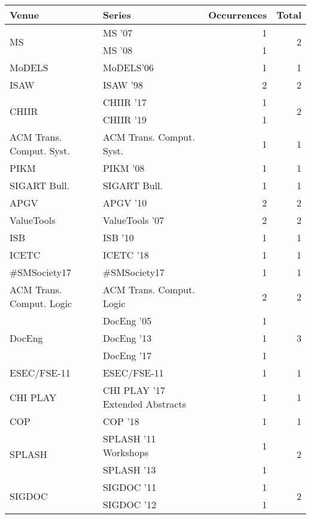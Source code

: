 \begin{table*}[t]
\begin{tabular}{llrr}
Venue & Series & Occurrences & Total\\\hline
\multirow{2}{*}{MS } & MS '07 & 1 & \multirow{2}{*}{2}\\
& MS '08 & 1 &\\
\multirow{1}{*}{MoDELS} & MoDELS'06 & 1 & \multirow{1}{*}{1}\\
\multirow{1}{*}{ISAW } & ISAW '98 & 2 & \multirow{1}{*}{2}\\
\multirow{2}{*}{CHIIR } & CHIIR '17 & 1 & \multirow{2}{*}{2}\\
& CHIIR '19 & 1 &\\
\multirow{1}{*}{ACM Trans. Comput. Syst.} & ACM Trans. Comput. Syst. & 1 & \multirow{1}{*}{1}\\
\multirow{1}{*}{PIKM } & PIKM '08 & 1 & \multirow{1}{*}{1}\\
\multirow{1}{*}{SIGART Bull.} & SIGART Bull. & 1 & \multirow{1}{*}{1}\\
\multirow{1}{*}{APGV } & APGV '10 & 2 & \multirow{1}{*}{2}\\
\multirow{1}{*}{ValueTools } & ValueTools '07 & 2 & \multirow{1}{*}{2}\\
\multirow{1}{*}{ISB } & ISB '10 & 1 & \multirow{1}{*}{1}\\
\multirow{1}{*}{ICETC } & ICETC '18 & 1 & \multirow{1}{*}{1}\\
\multirow{1}{*}{\#SMSociety17} & \#SMSociety17 & 1 & \multirow{1}{*}{1}\\
\multirow{1}{*}{ACM Trans. Comput. Logic} & ACM Trans. Comput. Logic & 2 & \multirow{1}{*}{2}\\
\multirow{3}{*}{DocEng } & DocEng '05 & 1 & \multirow{3}{*}{3}\\
& DocEng '13 & 1 &\\
& DocEng '17 & 1 &\\
\multirow{1}{*}{ESEC/FSE-11} & ESEC/FSE-11 & 1 & \multirow{1}{*}{1}\\
\multirow{1}{*}{CHI PLAY } & CHI PLAY '17 Extended Abstracts & 1 & \multirow{1}{*}{1}\\
\multirow{1}{*}{COP } & COP '18 & 1 & \multirow{1}{*}{1}\\
\multirow{2}{*}{SPLASH } & SPLASH '11 Workshops & 1 & \multirow{2}{*}{2}\\
& SPLASH '13 & 1 &\\
\multirow{2}{*}{SIGDOC } & SIGDOC '11 & 1 & \multirow{2}{*}{2}\\
& SIGDOC '12 & 1 &\\

\end{tabular}
\end{table*}
